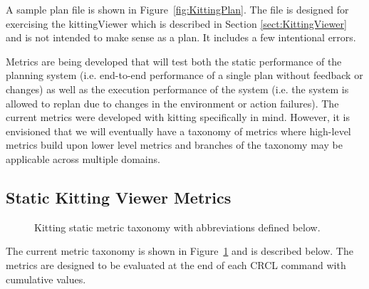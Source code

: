 A sample plan file is shown in Figure~\ref{fig:KittingPlan}. The file is
designed for exercising the kittingViewer which is described in Section \ref{sect:KittingViewer}
and is not intended to make sense
as a plan. It includes a few intentional errors.

Metrics are being developed that will test both the static performance of the planning system
(i.e. end-to-end performance of a single plan without feedback or changes) as well as the
execution performance of the system (i.e. the system is allowed to replan due to changes
in the environment or action failures). The current metrics were developed with
kitting specifically in mind. However, it is envisioned that we will eventually have
a taxonomy of metrics where high-level metrics build upon lower level metrics and
branches of the taxonomy may be applicable across multiple domains.

\subsection{Static Kitting Viewer Metrics}
\begin{figure}[ht!]
	\begin{center}
		
	\end{center}
	\caption{Kitting static metric taxonomy with abbreviations defined below.}
	\label{fig:StaticMetricTax}
\end{figure}

The current metric taxonomy is shown in Figure~\ref{fig:StaticMetricTax} and is
described below. The metrics are designed to be evaluated at the end of each
CRCL command with cumulative values.

